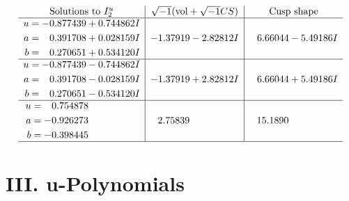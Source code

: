 \documentclass[1p]{elsarticle_modified}
\theoremstyle{definition}
\newcommand{\I}{\sqrt{-1}}
\begin{document}
$$\begin{array}{c|c|c}  
\text{Solutions to }I^u_{2}& \I (\text{vol} + \sqrt{-1}CS) & \text{Cusp shape}\\
 \hline 
\begin{aligned}
u &= -0.877439 + 0.744862 I \\
a &= \phantom{-}0.391708 + 0.028159 I \\
b &= \phantom{-}0.270651 + 0.534120 I\end{aligned}
 & -1.37919 - 2.82812 I & \phantom{-}6.66044 - 5.49186 I \\ \hline\begin{aligned}
u &= -0.877439 - 0.744862 I \\
a &= \phantom{-}0.391708 - 0.028159 I \\
b &= \phantom{-}0.270651 - 0.534120 I\end{aligned}
 & -1.37919 + 2.82812 I & \phantom{-}6.66044 + 5.49186 I \\ \hline\begin{aligned}
u &= \phantom{-}0.754878\phantom{ +0.000000I} \\
a &= -0.926273\phantom{ +0.000000I} \\
b &= -0.398445\phantom{ +0.000000I}\end{aligned}
 & \phantom{-}2.75839\phantom{ +0.000000I} & \phantom{-}15.1890\phantom{ +0.000000I}\\
 \hline 
 \end{array}$$\newpage
\newpage\renewcommand{\arraystretch}{1}
\centering \section*{ III. u-Polynomials}
\end{document}
